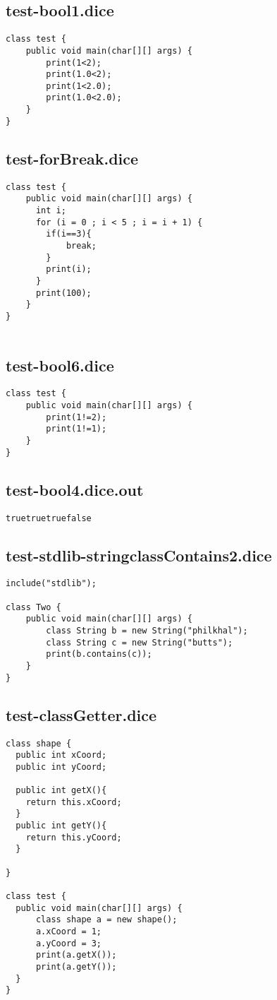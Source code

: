 \subsection{test-bool1.dice}
\begin{verbatim}
class test {
	public void main(char[][] args) {
		print(1<2);
		print(1.0<2);
		print(1<2.0);
		print(1.0<2.0);
	}
}
\end{verbatim}
\pagebreak
\subsection{test-forBreak.dice}
\begin{verbatim}
class test {
	public void main(char[][] args) {
	  int i;
	  for (i = 0 ; i < 5 ; i = i + 1) {
	  	if(i==3){
	  		break;
	  	}
	    print(i);
	  }
	  print(100);
	}
}


\end{verbatim}
\pagebreak
\subsection{test-bool6.dice}
\begin{verbatim}
class test {
	public void main(char[][] args) {
		print(1!=2);
		print(1!=1);
	}
}
\end{verbatim}
\pagebreak
\subsection{test-bool4.dice.out}
\begin{verbatim}
truetruetruefalse
\end{verbatim}
\pagebreak
\subsection{test-stdlib-stringclassContains2.dice}
\begin{verbatim}
include("stdlib");

class Two {
	public void main(char[][] args) {
        class String b = new String("philkhal");
        class String c = new String("butts");
        print(b.contains(c));
	}
}

\end{verbatim}
\pagebreak
\subsection{test-classGetter.dice}
\begin{verbatim}
class shape {
  public int xCoord;
  public int yCoord;

  public int getX(){
  	return this.xCoord;
  }
  public int getY(){
   	return this.yCoord;
  }

}

class test {
  public void main(char[][] args) {
      class shape a = new shape(); 
      a.xCoord = 1;
      a.yCoord = 3;
      print(a.getX());
      print(a.getY());
  }
}
\end{verbatim}
\pagebreak
